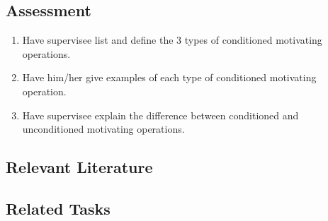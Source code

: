 \subsection{Assessment}
\begin{enumerate}
\item Have supervisee list and define the 3 types of conditioned motivating operations. 
\item Have him/her give examples of each type of conditioned motivating operation.
\item Have supervisee explain the difference between conditioned and unconditioned motivating operations.
%
\end{enumerate}
%
\subsection{Relevant Literature}
\begin{refsection}
\nocite{carbone2007role,
        cooper2007applied,
        laraway2003motivating,
        mcgill1999establishing,
        michael2004concepts,
        michael1993establishing,
        mineka1975some,
        rosales2007contriving}
\printbibliography[heading=none]
\end{refsection}
%
\subsection{Related Tasks}
\fourdOne{}\\
\foureOne{}\\
\fourFKThirteen{}\\
\fourFKFourteen{}\\
\fourFKFifteen{}\\
\fourFKSixteen{}\\
\fourFKEighteen{}\\
\fourFKTwenty{}\\
\fourFKTwentySeven{}\\
\fourFKTwentyNine{}\\
\fourFKThirty{}\\
